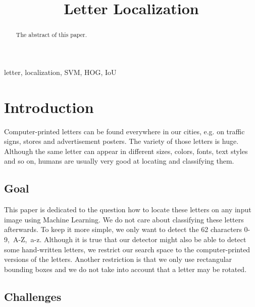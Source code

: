 \documentclass[conference]{IEEEtran}
\begin{document}
\title{Letter Localization}

\author{
}

\maketitle

\begin{abstract}
The abstract of this paper.
\end{abstract}

\begin{IEEEkeywords}
letter, localization, SVM, HOG, IoU
\end{IEEEkeywords}

\section{Introduction}

Computer-printed letters can be found everywhere in our cities, e.g. on traffic signs, stores and advertisement posters. The variety of those letters is huge. Although the same letter can appear in different sizes, colors, fonts, text styles and so on, humans are usually very good at locating and classifying them.

\subsection{Goal}

This paper is dedicated to the question how to locate these letters on any input image using Machine Learning. We do not care about classifying these letters afterwards. To keep it more simple, we only want to detect the 62 characters \mbox{0-9, A-Z, a-z}. Although it is true that our detector might also be able to detect some hand-written letters, we restrict our search space to the computer-printed versions of the letters. Another restriction is that we only use rectangular bounding boxes and we do not take into account that a letter may be rotated.

\subsection{Challenges}
\end{document}
